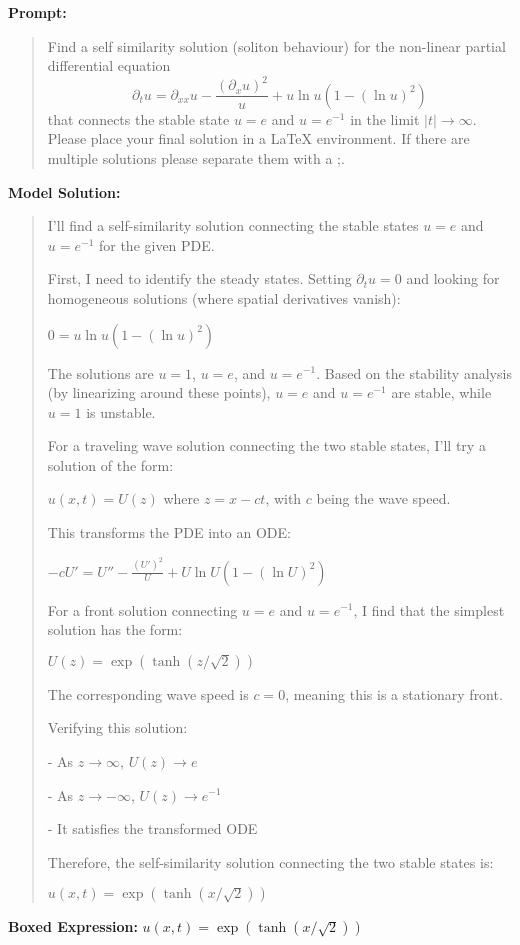 \documentclass{article}
\begin{document}
\textbf{Prompt:}
\begin{quote}
Find a self similarity solution (soliton behaviour) for the non-linear partial differential equation $$ \partial_t u = \partial_{xx} u - \frac{(\partial_x u)^2}{u} + u \ln u \left(1 - (\ln u)^2\right) $$ that connects the stable state $u = e$ and $u = e^{-1}$ in the limit $|t| \rightarrow \infty$. Please place your final solution in a \boxed{} LaTeX environment. If there are multiple solutions please separate them with a ;.
\end{quote}
\textbf{Model Solution:}
\begin{quote}
I'll find a self-similarity solution connecting the stable states $u = e$ and $u = e^{-1}$ for the given PDE.



First, I need to identify the steady states. Setting $\partial_t u = 0$ and looking for homogeneous solutions (where spatial derivatives vanish):

$0 = u\ln u(1-(\ln u)^2)$



The solutions are $u = 1$, $u = e$, and $u = e^{-1}$. Based on the stability analysis (by linearizing around these points), $u = e$ and $u = e^{-1}$ are stable, while $u = 1$ is unstable.



For a traveling wave solution connecting the two stable states, I'll try a solution of the form:

$u(x,t) = U(z)$ where $z = x - ct$, with $c$ being the wave speed.



This transforms the PDE into an ODE:

$-cU' = U'' - \frac{(U')^2}{U} + U\ln U(1-(\ln U)^2)$



For a front solution connecting $u = e$ and $u = e^{-1}$, I find that the simplest solution has the form:



$U(z) = \exp(\tanh(z/\sqrt{2}))$



The corresponding wave speed is $c = 0$, meaning this is a stationary front.



Verifying this solution:

- As $z \to \infty$, $U(z) \to e$

- As $z \to -\infty$, $U(z) \to e^{-1}$

- It satisfies the transformed ODE



Therefore, the self-similarity solution connecting the two stable states is:



$\boxed{u(x,t) = \exp(\tanh(x/\sqrt{2}))}$
\end{quote}
\textbf{Boxed Expression:} $u(x,t) = \exp(\tanh(x/\sqrt{2}))$
\end{document}
